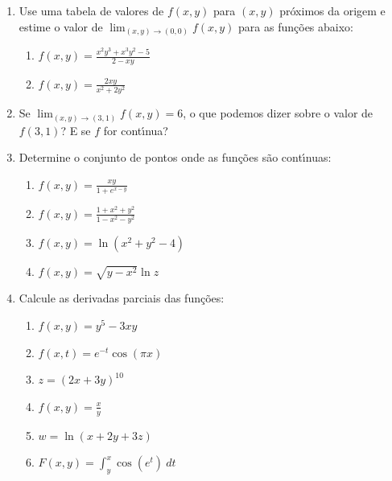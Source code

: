 \documentclass[a4paper,5pt]{amsbook}
\newcommand{\ds}{\displaystyle}
\newcommand{\ra}{\rightarrow}
\begin{document}
\vspace{1cm}
\begin{enumerate}
    \setlength\itemsep{0.5cm}
    \item Use uma tabela de valores de $f(x,y)$ para $(x,y)$ pr\'oximos da origem
    e estime o valor de $\ds\lim_{(x,y)\ra(0,0)} f(x,y)$ para as fun\c{c}\~oes
    abaixo:
        \begin{enumerate}
            \setlength\itemsep{0.2cm}
            \item $f(x,y) = \ds\frac{x^2y^3+x^3y^2-5}{2-xy}$
            \item $f(x,y) = \ds\frac{2xy}{x^2+2y^2}$
        \end{enumerate}

    \item Se $\ds\lim_{(x,y)\ra(3,1)} f(x,y) = 6$, o que podemos dizer sobre o
    valor de $f(3,1)$? E se $f$ for cont\'{\i}nua?

    \item Determine o conjunto de pontos onde as fun\c{c}\~oes s\~ao cont\'{\i}nuas:
        \begin{enumerate}
            \setlength\itemsep{0.2cm}
            \item $f(x,y) = \ds\frac{xy}{1+e^{x-y}}$
            \item $f(x,y) = \ds\frac{1+x^2+y^2}{1-x^2-y^2}$
            \item $f(x,y) = \ln{(x^2+y^2-4)}$
            \item $f(x,y) = \sqrt{y-x^2}\ln{z}$
        \end{enumerate}

    \item Calcule as derivadas parciais das fun\c{c}\~oes:
        \begin{enumerate}
            \setlength\itemsep{0.2cm}
            \item $f(x,y) = y^5-3xy$
            \item $f(x,t) = e^{-t}\cos{(\pi x)}$
            \item $z = (2x+3y)^{10}$
            \item $f(x,y) = \ds\frac{x}{y}$
            \item $w = \ln{(x+2y+3z)}$
            \item $F(x,y) = \ds\int_y^x \cos{(e^t)}\ dt$
        \end{enumerate}


\end{enumerate}
\end{document}
